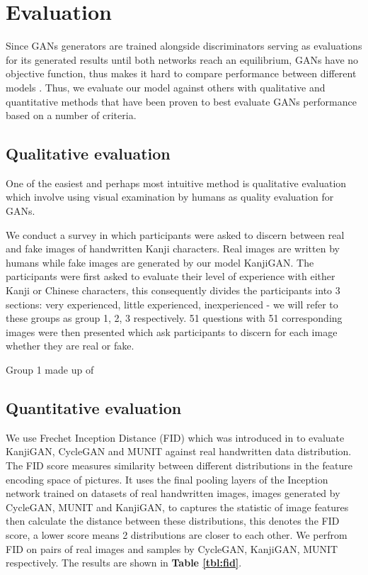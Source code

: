 \documentclass[12pt]{report}
\begin{document}
\section{Evaluation}
Since GANs generators are trained alongside discriminators serving as evaluations for its generated results until both networks reach an equilibrium, GANs have no objective function, thus makes it hard to compare performance between different models \cite{training-gans}.
Thus, we evaluate our model against others with qualitative and quantitative methods that have been proven to best evaluate GANs performance based on a number of criteria\cite{gan-measure}.

\subsection{Qualitative evaluation}
One of the easiest and perhaps most intuitive method is qualitative evaluation which involve using visual examination by humans as quality evaluation for GANs. 

We conduct a survey in which participants were asked to discern between real and fake images of handwritten Kanji characters. Real images are written by humans while fake images are generated by our model KanjiGAN. The participants were first asked to evaluate their level of experience with either Kanji or Chinese characters, this consequently divides the participants into 3 sections: very experienced, little experienced, inexperienced -  we will refer to these groups as group 1, 2, 3 respectively. 51 questions with 51 corresponding images were then presented which ask participants to discern for each image whether they are real or fake.

Group 1 made up of

\subsection{Quantitative evaluation}

We use Frechet Inception Distance (FID) which was introduced in \cite{fid} to evaluate KanjiGAN, CycleGAN and MUNIT against real handwritten data distribution. The FID score measures similarity between different distributions in the feature encoding space of pictures. It uses the final pooling layers of the Inception network trained on datasets of real handwritten images, images generated by CycleGAN, MUNIT and KanjiGAN, to captures the statistic of image features then calculate the distance between these distributions, this denotes the FID score, a lower score means 2 distributions are closer to each other. We perfrom FID on pairs of real images and samples by CycleGAN, KanjiGAN, MUNIT respectively. The results are shown in \textbf{Table \ref{tbl:fid}}.
\end{document}
